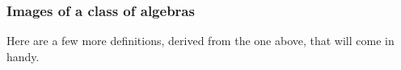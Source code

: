 \subsubsection{Images of a class of algebras}\label{images-of-a-class-of-algebras}
Here are a few more definitions, derived from the one above, that will come in handy.
\ccpad
\begin{code}%
\>[0]\AgdaSpace{}%
\AgdaSymbol{:}\AgdaSpace{}%
\AgdaSymbol{\{}\AgdaSpace{}%
\AgdaSpace{}%
\AgdaSymbol{:}\AgdaSpace{}%
\AgdaSymbol{\}}\AgdaSpace{}%
\AgdaSymbol{(}\AgdaSpace{}%
\AgdaSymbol{:}\AgdaSpace{}%
\AgdaSpace{}%
\AgdaSpace{}%
\AgdaSymbol{)}\<%
\\
\>[0][@{}l@{\AgdaIndent{0}}]%
\>[2]%
\>[19]\AgdaSymbol{(}\AgdaSpace{}%
\AgdaSymbol{:}\AgdaSpace{}%
\AgdaSpace{}%
\AgdaSpace{}%
\AgdaSymbol{)}\AgdaSpace{}%
\AgdaSpace{}%
\AgdaSpace{}%
\AgdaSpace{}%
\AgdaSpace{}%
\AgdaSpace{}%
\AgdaSpace{}%
\AgdaSpace{}%
\AgdaSpace{}%
\AgdaSpace{}%
\<%
\\
%
\\[\AgdaEmptyExtraSkip]%
\>[0]\AgdaSpace{}%
\AgdaSymbol{\{}\AgdaSymbol{\}\{}\AgdaSymbol{\}}\AgdaSpace{}%
\AgdaSpace{}%
\AgdaSpace{}%
\AgdaSymbol{=}\AgdaSpace{}%
\AgdaSpace{}%
\AgdaSpace{}%
\AgdaSpace{}%
\AgdaSymbol{(}\AgdaSymbol{\{}\AgdaSymbol{\}\{}\AgdaSymbol{\}}\AgdaSpace{}%
\AgdaSymbol{)}\AgdaSpace{}%
\AgdaFunction{,}\AgdaSpace{}%
\AgdaSpace{}%
\AgdaSpace{}%
\AgdaSpace{}%
\AgdaSpace{}%
\<%
\\
%
\\[\AgdaEmptyExtraSkip]%
\>[0]\AgdaSpace{}%
\AgdaSymbol{:}\AgdaSpace{}%
\AgdaSymbol{\{}\AgdaSpace{}%
\AgdaSymbol{:}\AgdaSpace{}%

\end{code}
